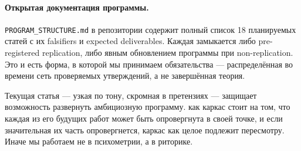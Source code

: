 \paragraph{Открытая документация программы.} \texttt{PROGRAM\_STRUCTURE.md} в репозитории содержит полный список 18 планируемых статей с их falsifiers и expected deliverables. Каждая замыкается либо pre-registered replication, либо явным обновлением программы при non-replication. Это и есть форма, в которой мы принимаем обязательства --- распределённая во времени сеть проверяемых утверждений, а не завершённая теория.

Текущая статья --- узкая по тону, скромная в претензиях --- защищает возможность развернуть амбициозную программу. \DEIC{} как каркас стоит на том, что каждая из его будущих работ может быть опровергнута в своей точке, и если значительная их часть опровергнется, каркас как целое подлежит пересмотру. Иначе мы работаем не в психометрии, а в риторике.
